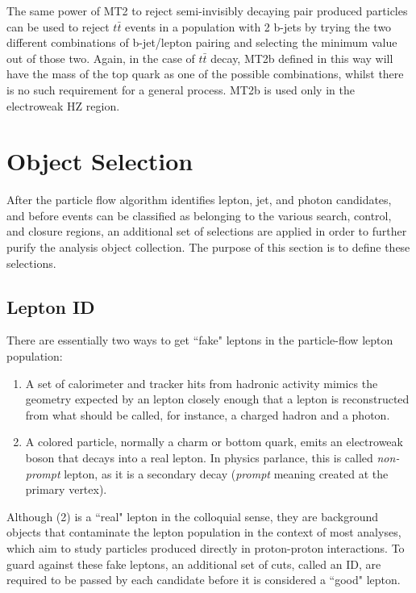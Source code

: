       The same power of MT2 to reject semi-invisibly decaying pair produced particles can be used to reject $t\bar{t}$ events in a population with 2 b-jets by trying the two different combinations of b-jet/lepton pairing and selecting the minimum value out of those two. Again, in the case of $t\bar{t}$ decay, MT2b defined in this way will have the mass of the top quark as one of the possible combinations, whilst there is no such requirement for a general process. MT2b is used only in the electroweak HZ region.

\section{Object Selection} \label{sec:object_selection}


  After the particle flow algorithm identifies lepton, jet, and photon candidates, and before events can be classified as belonging to the various search, control, and closure regions, an additional set of selections are applied in order to further purify the analysis object collection. The purpose of this section is to define these selections.

  \subsection{Lepton ID} \label{sec:lepton_id}
    There are essentially two ways to get ``fake" leptons in the particle-flow lepton population:

    \begin{enumerate}
      \item A set of calorimeter and tracker hits from hadronic activity mimics the geometry expected by an lepton closely enough that a lepton is reconstructed from what should be called, for instance, a charged hadron and a photon.
      \item A colored particle, normally a charm or bottom quark, emits an electroweak boson that decays into a real lepton. In physics parlance, this is called \emph{non-prompt} lepton, as it is a secondary decay (\emph{prompt} meaning created at the primary vertex).
    \end{enumerate}

    Although (2) is a ``real" lepton in the colloquial sense, they are background objects that contaminate the lepton population in the context of most analyses, which aim to study particles produced directly in proton-proton interactions. To guard against these fake leptons, an additional set of cuts, called an ID, are required to be passed by each candidate before it is considered a ``good" lepton.

